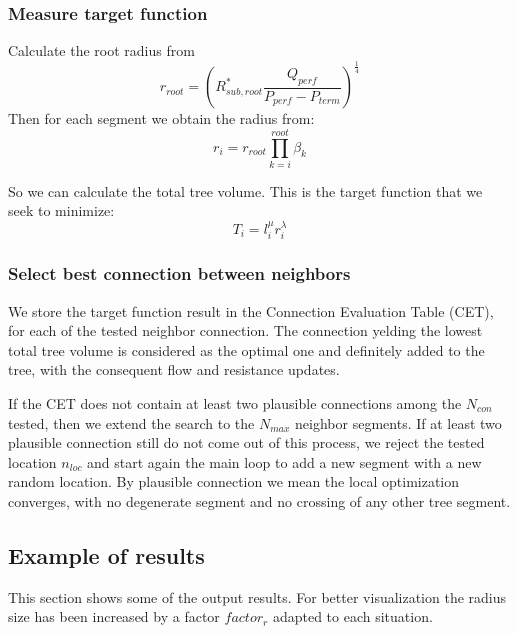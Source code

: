 \documentclass[a4paper, 11pt]{article} %
\begin{document}
\subsubsection{Measure target function}
Calculate the root radius from
\begin{equation}
r_{root} = \left( R_{sub, root}^* \frac{Q_{perf}}{P_{perf}-P_{term}}\right)^\frac{1}{4}
\end{equation}
Then for each segment we obtain the radius from:
\begin{equation}
r_i = r_{root} \prod\limits_{k=i}^{root} \beta_k
\end{equation}

So we can calculate the total tree volume. This is the target function that we seek to minimize:
\begin{equation}
T_i = l_i^{\mu} r_i^{\lambda}
\end{equation}

 

\subsubsection{Select best connection between neighbors}
We store the target function result in the Connection Evaluation Table (CET), for each of the tested neighbor connection. The connection yelding the lowest total tree volume is considered as the optimal one and definitely added to the tree, with the consequent flow and resistance updates.

If the CET does not contain at least two plausible connections among the $N_{con}$ tested, then we extend the search to the $N_{max}$ neighbor segments. If at least two plausible connection still do not come out of this process, we reject the tested location $n_{loc}$ and start again the main loop to add a new segment with a new random location.
By plausible connection we mean the local optimization converges, with no degenerate segment and no crossing of any other tree segment. 


\subsection{Example of results}
This section shows some of the output results. For better visualization the radius size has been increased by a factor $factor_r$ adapted to each situation.
\end{document}
